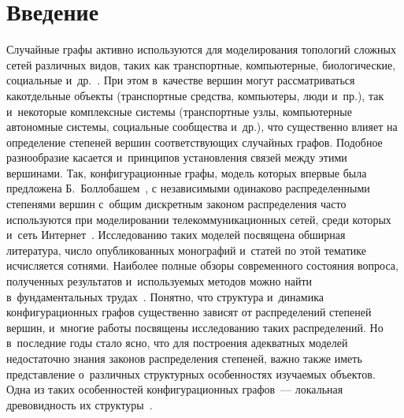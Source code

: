 \vspace*{3pt}



\thispagestyle{headings}

\begin{multicols}{2}

\label{st\stat}


\section{Введение}

Случайные графы активно используются для моделирования топологий сложных сетей 
различных видов, таких
как транспортные, компьютерные, биологические, социальные и~др.~\cite{Dur,Hof1,Hof2,Fa}.
При этом в~качестве вершин могут рассматриваться как\linebreak отдельные объекты 
(транспортные средства,
компьютеры, люди и~пр.), так и~некоторые комплекс\-ные сис\-те\-мы (транспортные узлы, 
компьютерные автономные
сис\-те\-мы, социальные сообщества и~др.), что существенно влияет на определение 
степеней вершин соответствующих
случайных графов. Подобное разнообразие касается и~принципов установления связей 
между этими вершинами.
Так, конфигурационные графы, модель которых впервые была предложена 
Б.~Боллобашем~\cite{Bol},
с независимыми одинаково распределенными степенями вершин с~общим дискретным 
законом распределения
часто используются при моделировании телекоммуникационных сетей, среди которых и~сеть Интернет~\cite{Fa,RN}.
Исследованию таких моделей посвящена обширная литература, число опуб\-ли\-ко\-ван\-ных 
монографий и~статей по этой тематике исчисляется сотнями. Наиболее полные обзоры 
современного со\-сто\-яния вопроса, полученных результатов и~ис\-поль\-зу\-емых методов 
можно найти в~фундаментальных трудах~\cite{Hof1, Hof2}. Понятно, что структура и~динамика конфигурационных графов существенно зависят от распределений степеней 
вершин, и~многие работы посвящены исследованию таких распределений. Но 
в~последние годы стало яс\-но, что для построения адекватных моделей недостаточно 
знания законов распределения степеней, важ\-но также иметь пред\-став\-ле\-ние о~различных структурных особенностях изуча\-емых объектов.
Одна из таких особенностей конфигурационных графов~--- локальная дре\-во\-вид\-ность 
их структуры~\cite{Hof1, Pav, PavCh}.


\end{multicols}
